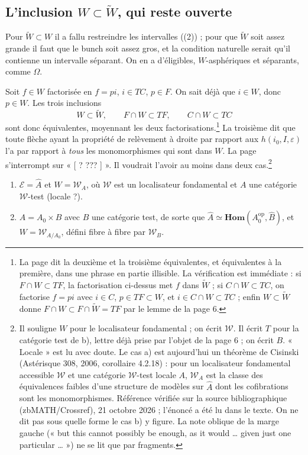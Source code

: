 \documentclass[11pt,a4paper]{article}
\begin{document}
\subsection*{L'inclusion $W \subset \widetilde W$, qui reste ouverte}

Pour $\widetilde W \subset W$ il a fallu restreindre les intervalles ((2)) ; pour
que $\widetilde W$ soit assez grande il faut que le bunch soit assez gros, et
la condition naturelle serait qu'il contienne un intervalle séparant. On en a
d'éligibles, $W$-asphériques et séparants, comme $\Omega$.

Soit $f \in W$ factorisée en $f = pi$, $i \in TC$, $p \in F$. On sait déjà que
$i \in W$, donc $p \in W$. Les trois inclusions
\[
W \subset \widetilde W, \qquad F \cap W \subset TF, \qquad C \cap W \subset TC
\]
sont donc équivalentes, moyennant les deux factorisations.\footnote{La page
dit la deuxième et la troisième équivalentes, et équivalentes à la première,
dans une phrase en partie illisible. La vérification est immédiate : si
$F \cap W \subset TF$, la factorisation ci-dessus met $f$ dans
$\widetilde W$ ; si $C \cap W \subset TC$, on factorise $f = pi$ avec
$i \in C$, $p \in TF \subset W$, et $i \in C \cap W \subset TC$ ; enfin
$W \subset \widetilde W$ donne $F \cap W \subset F \cap \widetilde W = TF$ par
le lemme de la page 6.} La troisième dit que toute flèche ayant la propriété
de relèvement à droite par rapport aux $h(i_0, I, \varepsilon)$ l'a par
rapport à \emph{tous} les monomorphismes qui sont dans $W$. La page
s'interrompt sur « [ ? ??? ] ». Il voudrait l'avoir au moins dans deux cas.\footnote{Il souligne $W$ pour le localisateur fondamental ; on écrit
$\mathcal{W}$. Il écrit $T$ pour la catégorie test de b), lettre déjà prise
par l'objet de la page 6 ; on écrit $B$. « Locale » est lu avec doute. Le cas a) est aujourd'hui un théorème de Cisinski (Astérisque 308, 2006, corollaire 4.2.18) : pour un
localisateur fondamental accessible $\mathcal{W}$ et une catégorie
$\mathcal{W}$-test locale $A$, $\mathcal{W}_A$ est la classe des équivalences
faibles d'une structure de modèles sur $\widehat{A}$ dont les cofibrations sont
les monomorphismes. Référence vérifiée sur la source bibliographique (zbMATH/Crossref), 21 octobre 2026 ; l'énoncé a été lu dans le texte. On ne dit pas sous quelle forme le cas b) y figure. La note oblique de la marge gauche (« but
this cannot possibly be enough, as it would … given just one particular … »)
ne se lit que par fragments.}
\begin{enumerate}
\item[a)] $\mathcal{E} = \widehat{A}$ et $W = \mathcal{W}_A$, où
$\mathcal{W}$ est un localisateur fondamental et $A$ une catégorie
$\mathcal{W}$-test (locale ?).
\item[b)] $A = A_0 \times B$ avec $B$ une catégorie test, de sorte que
$\widehat{A} \simeq \mathbf{Hom}(A_0^{\mathrm{op}}, \widehat{B})$, et
$W = \mathcal{W}_{A/A_0}$, défini fibre à fibre par $\mathcal{W}_B$.
\end{enumerate}
\end{document}
